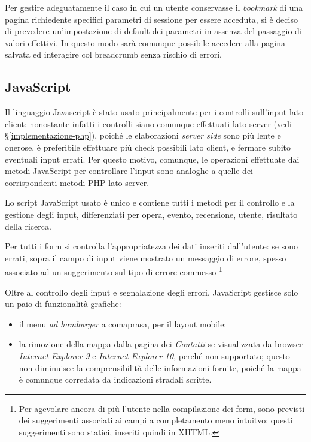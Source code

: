 Per gestire adeguatamente il caso in cui un utente conservasse il \textit{bookmark} di una pagina richiedente specifici parametri di sessione per essere acceduta, si è deciso di prevedere un'impostazione di default dei parametri in assenza del passaggio di valori effettivi. In questo modo sarà comunque possibile accedere alla pagina salvata ed interagire col breadcrumb senza rischio di errori.


\subsection{JavaScript}
\label{implementazione-javascript}
Il linguaggio Javascript è stato usato principalmente per i controlli sull'input lato client: nonostante infatti i controlli siano comunque effettuati lato server (vedi §\ref{implementazione-php}), poiché le elaborazioni \textit{server side} sono più lente e onerose, è preferibile effettuare più check possibili lato client, e fermare subito eventuali input errati. Per questo motivo, comunque, le operazioni effettuate dai metodi JavaScript per controllare l'input sono analoghe a quelle dei corrispondenti metodi PHP lato server.

Lo script JavaScript usato è unico e contiene tutti i metodi per il controllo e la gestione degli input, differenziati per opera, evento, recensione, utente, risultato della ricerca.

Per tutti i form si controlla l'appropriatezza dei dati inseriti dall'utente: se sono errati, sopra il campo di input viene mostrato un messaggio di errore, spesso associato ad un suggerimento sul tipo di errore commesso \footnote{Per agevolare ancora di più l'utente nella compilazione dei form, sono previsti dei suggerimenti associati ai campi a completamento meno intuitvo; questi suggerimenti sono statici, inseriti quindi  in XHTML.}

Oltre al controllo degli input e segnalazione degli errori, JavaScript gestisce solo un paio di funzionalità grafiche:
\begin{itemize}
	\item il menu \textit{ad hamburger} a comaprasa, per il layout mobile;
	\item la rimozione della mappa dalla pagina dei \textit{Contatti} se visualizzata da browser \textit{Internet Explorer 9} e \textit{Internet Explorer 10}, perché non supportato; questo non diminuisce la comprensibilità delle informazioni fornite, poiché la mappa è comunque corredata da indicazioni stradali scritte.
\end{itemize}


